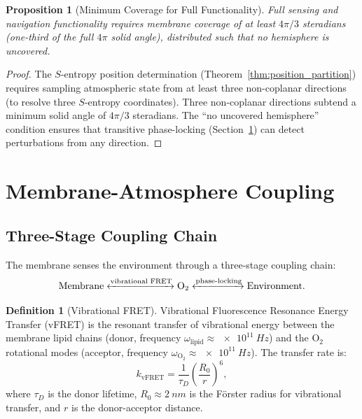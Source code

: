 \documentclass[twocolumn,10pt]{article}
\newtheorem{proposition}[theorem]{Proposition}
\theoremstyle{definition}
\newtheorem{definition}[theorem]{Definition}
\theoremstyle{remark}
\begin{document}
\begin{proposition}[Minimum Coverage for Full Functionality]
\label{prop:min_coverage}
Full sensing and navigation functionality requires membrane coverage of at least $4\pi/3$ steradians (one-third of the full $4\pi$ solid angle), distributed such that no hemisphere is uncovered.
\end{proposition}

\begin{proof}
The $S$-entropy position determination (Theorem~\ref{thm:position_partition}) requires sampling atmospheric state from at least three non-coplanar directions (to resolve three $S$-entropy coordinates). Three non-coplanar directions subtend a minimum solid angle of $4\pi/3$ steradians. The ``no uncovered hemisphere'' condition ensures that transitive phase-locking (Section~\ref{sec:atmosphere_coupling}) can detect perturbations from any direction.
\end{proof}




\section{Membrane-Atmosphere Coupling}
\label{sec:atmosphere_coupling}

\subsection{Three-Stage Coupling Chain}

The membrane senses the environment through a three-stage coupling chain:
\begin{equation}
  \text{Membrane} \xleftrightarrow{\text{vibrational FRET}} \mathrm{O}_2 \xleftrightarrow{\text{phase-locking}} \text{Environment}.
  \label{eq:coupling_chain}
\end{equation}

\begin{definition}[Vibrational FRET]
\label{def:vfret}
Vibrational Fluorescence Resonance Energy Transfer (vFRET) is the resonant transfer of vibrational energy between the membrane lipid chains (donor, frequency $\omega_{\mathrm{lipid}} \approx \SI{e11}{Hz}$) and the $\mathrm{O}_2$ rotational modes (acceptor, frequency $\omega_{\mathrm{O}_2} \approx \SI{e11}{Hz}$). The transfer rate is:
\begin{equation}
  k_{\mathrm{vFRET}} = \frac{1}{\tau_D}\left(\frac{R_0}{r}\right)^6,
  \label{eq:vfret}
\end{equation}
where $\tau_D$ is the donor lifetime, $R_0 \approx \SI{2}{nm}$ is the F\"orster radius for vibrational transfer, and $r$ is the donor-acceptor distance.
\end{definition}
\end{document}
